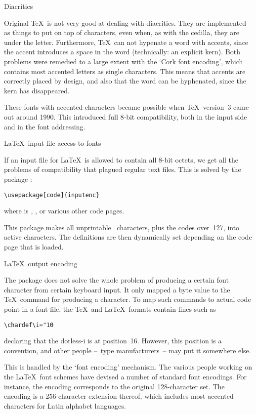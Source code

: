  {Diacritics}

Original \TeX\ is not very good at dealing with diacritics. They are
implemented as things to put on top of characters, even when, as with
the cedilla, they are under the letter. Furthermore, \TeX\ can not
hypenate a word with accents, since the accent introduces a space in
the word (technically: an explicit kern).
Both problems were remedied to a large extent with the `Cork font
encoding', which contains most accented letters as single
characters. This means that accents are correctly placed by design,
and also that the word can be hyphenated, since the kern has disappeared.

These fonts with accented characters became possible when
\TeX\ version~3 came out around 1990. This introduced full 8-bit
compatibility, both in the input side and in the font addressing.

 {\LaTeX\ input file access to fonts}

If an input file for \LaTeX\ is allowed to contain all 8-bit octets,
we get all the problems of compatibility that plagued regular text
files. This is solved by the package :
\begin{verbatim}
\usepackage[code]{inputenc}
\end{verbatim}
where  is , , or various other
code pages.

This package makes all unprintable \ascii\ characters, plus the codes
over~127, into active characters. The definitions are then dynamically
set depending on the code page that is loaded.

 {\LaTeX\ output encoding}

The  package does not solve the whole problem of producing
a certain font character from certain keyboard input. It only mapped a
byte value to the \TeX\ command for producing a character. To map such
commands to actual code point in a font file, the \TeX\ and
\LaTeX\ formats contain lines such as
\begin{verbatim}
\chardef\i="10
\end{verbatim}
declaring that the dotless-i is at position~16. However, this position
is a convention, and other people --~type manufacturers~-- may put it
somewhere else.

This is handled by the `font encoding'
mechanism.
The various people working on the \LaTeX\ font schemes have devised a
number of standard font encodings. For instance, the
 encoding corresponds to the original 128-character
set. The  encoding is a 256-character extension
thereof, which includes most accented characters for Latin alphabet
languages.

